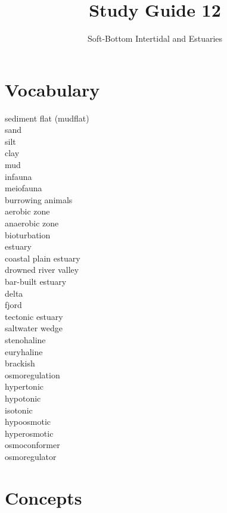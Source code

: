 \documentclass[nofonts, letterpaper]{tufte-handout}
\title{Study Guide 12}%
\author{Soft-Bottom Intertidal and Estuaries}
\date{} %
\begin{document}
\maketitle	%


\section{Vocabulary}
\vspace{-1\baselineskip}
\begin{multicols}{2}
sediment flat (mudflat)\\
sand\\
silt\\
clay\\
mud\\
infauna\\
meiofauna\\
burrowing animals\\
aerobic zone\\
anaerobic zone\\
bioturbation\\
estuary\\
coastal plain estuary\\
drowned river valley\\
bar-built estuary\\
delta\\
fjord\\
tectonic estuary\\
saltwater wedge\\
stenohaline\\
euryhaline\\
brackish\\
osmoregulation\\
hypertonic\\
hypotonic\\
isotonic\\
hypoosmotic\\
hyperosmotic\\
osmoconformer\\
osmoregulator
\end{multicols}

\section{Concepts}
\end{document}
